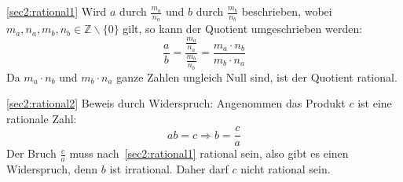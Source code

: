 \documentclass[10pt, a4paper, reqno]{amsart}
\makeatletter
\renewcommand\proofname{Beweis}
\renewenvironment{proof}[1][\proofname]{\par
\pushQED{\qed}%
\normalfont \topsep6\p@\@plus6\p@\relax
\trivlist
\item\relax
{\bfseries#1}\hspace\labelsep\ignorespaces
}{%
\popQED\endtrivlist\@endpefalse
}
\newenvironment{proof_thm}[1]{
\begin{proof}[\proofname~(#1)]}{\end{proof}}
\makeatother
\begin{document}
\begin{proof_thm}{\autoref{sec2:rational1}}
  Wird $a$ durch $\frac{m_a}{n_a}$ und $b$ durch $\frac{m_b}{n_b}$ beschrieben,
  wobei $m_a,n_a,m_b,n_b∈ℤ\backslash\{0\}$ gilt, so kann der Quotient umgeschrieben werden:
  \begin{equation*}
    \frac{a}{b} = \dfrac{\frac{m_a}{n_a}}{\frac{m_b}{n_b}}=\frac{m_a\cdot n_b}{m_b\cdot n_a}
  \end{equation*}
  Da $m_a\cdot n_b$ und $m_b\cdot n_a$ ganze Zahlen ungleich
  Null sind, ist der Quotient rational.
\end{proof_thm}
\begin{proof_thm}{\autoref{sec2:rational2}}
  Beweis durch Widerspruch: Angenommen das Produkt $c$ ist eine rationale Zahl:
  \begin{equation*}
    ab=c \Rightarrow b =\frac{c}{a}
  \end{equation*}
  Der Bruch $\frac{c}{a}$ muss nach~\autoref{sec2:rational1} rational sein, also
  gibt es einen Widerspruch, denn $b$ ist irrational. Daher darf $c$ nicht
  rational sein.
\end{proof_thm}
\end{document}
